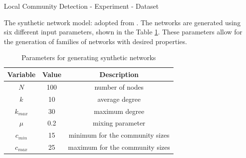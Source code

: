 \documentclass[9pt]{beamer}
\begin{document}
\begin{frame}{Local Community Detection - Experiment - Dataset}

The synthetic network model: adopted from \cite{lancichinetti2009benchmarks}. The networks are generated using six different input parameters, shown in the Table \ref{synthetic_network_parameter}. These parameters allow for the generation of families of networks with desired properties.
\begin{table}[]
\centering
\caption{Parameters for generating synthetic networks}
\label{synthetic_network_parameter}
\begin{tabular}{ccc}
\hline
Variable & Value & Description                     \\ \hline
$N$     & 100   & number of nodes                 \\
$k$     & 10    & average degree                  \\
$k_{max}$  & 30    & maximum degree                  \\
$\mu$ & 0.2   & mixing parameter                \\
$c_{min}$  & 15    & minimum for the community sizes \\
$c_{max}$  & 25    & maximum for the community sizes \\ \hline
\end{tabular}
\end{table}

\end{frame}
\end{document}
